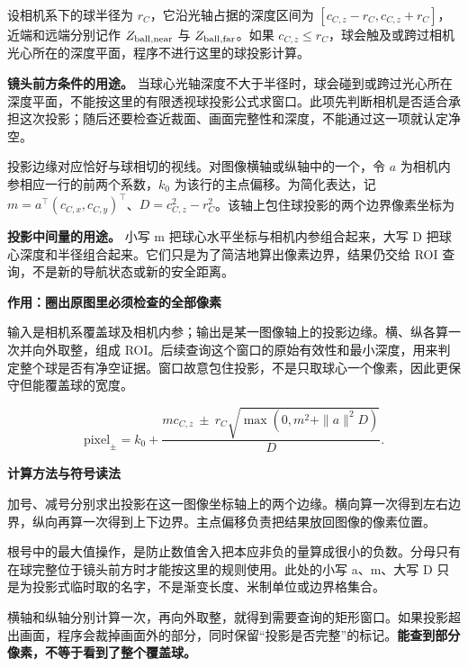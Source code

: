 \documentclass[12pt,a4paper]{article}
\numberwithin{equation}{topic}
\begin{document}
设相机系下的球半径为 \(r_C\)，它沿光轴占据的深度区间为 \([c_{C,z}-r_C,c_{C,z}+r_C]\)，近端和远端分别记作 \(Z_{\rm ball,near}\) 与 \(Z_{\rm ball,far}\)。如果 \(c_{C,z}\le r_C\)，球会触及或跨过相机光心所在的深度平面，程序不进行这里的球投影计算。

\textbf{镜头前方条件的用途。} 当球心光轴深度不大于半径时，球会碰到或跨过光心所在深度平面，不能按这里的有限透视球投影公式求窗口。此项先判断相机是否适合承担这次投影；随后还要检查近裁面、画面完整性和深度，不能通过这一项就认定净空。

投影边缘对应恰好与球相切的视线。对图像横轴或纵轴中的一个，令 \(a\) 为相机内参相应一行的前两个系数，\(k_0\) 为该行的主点偏移。为简化表达，记 \(m=a^\top(c_{C,x},c_{C,y})^\top\)、\(D=c_{C,z}^2-r_C^2\)。该轴上包住球投影的两个边界像素坐标为

\textbf{投影中间量的用途。} 小写 m 把球心水平坐标与相机内参组合起来，大写 D 把球心深度和半径组合起来。它们只是为了简洁地算出像素边界，结果仍交给 ROI 查询，不是新的导航状态或新的安全距离。

\noindent\textbf{作用：圈出原图里必须检查的全部像素}\par\nobreak
输入是相机系覆盖球及相机内参；输出是某一图像轴上的投影边缘。横、纵各算一次并向外取整，组成 ROI。后续查询这个窗口的原始有效性和最小深度，用来判定整个球是否有净空证据。窗口故意包住投影，不是只取球心一个像素，因此更保守但能覆盖球的宽度。

\begin{equation}
\label{eq:image-bounds}
\mathrm{pixel}_{\pm}=k_0+
\frac{m c_{C,z}\ \pm\ r_C\sqrt{\max(0,m^2+\|a\|^2D)}}{D}.
\end{equation}

\noindent\textbf{计算方法与符号读法}\par\nobreak
加号、减号分别求出投影在这一图像坐标轴上的两个边缘。横向算一次得到左右边界，纵向再算一次得到上下边界。主点偏移负责把结果放回图像的像素位置。

根号中的最大值操作，是防止数值舍入把本应非负的量算成很小的负数。分母只有在球完整位于镜头前方时才能按这里的规则使用。此处的小写 a、m、大写 D 只是为投影式临时取的名字，不是渐变长度、米制单位或边界格集合。


横轴和纵轴分别计算一次，再向外取整，就得到需要查询的矩形窗口。如果投影超出画面，程序会裁掉画面外的部分，同时保留“投影是否完整”的标记。\textbf{能查到部分像素，不等于看到了整个覆盖球。}
\end{document}
